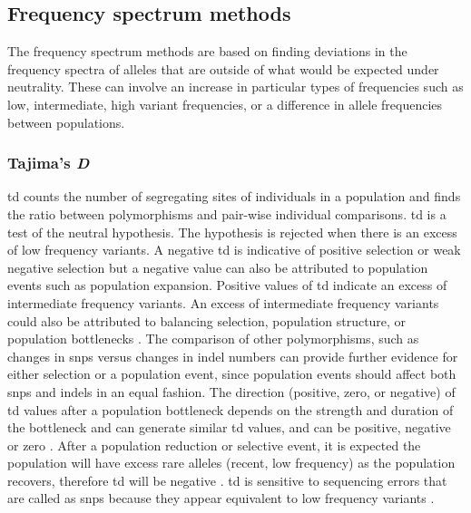 \documentclass[]{report}
\begin{document}
\subsection{Frequency spectrum
methods}\label{frequency-spectrum-methods}

The frequency spectrum methods are based on finding deviations in the
frequency spectra of alleles that are outside of what would be expected
under neutrality. These can involve an increase in particular types of
frequencies such as low, intermediate, high variant frequencies, or a
difference in allele frequencies between populations.

\subsubsection{\texorpdfstring{Tajima's
\emph{D}}{Tajima's D}}\label{tajimas-d}

\gls{td} \citep{Tajima1989} counts the number of segregating sites of
individuals in a population and finds the ratio between polymorphisms
and pair-wise individual comparisons. \Gls{td} is a test of the neutral
hypothesis. The hypothesis is rejected when there is an excess of low
frequency variants. A negative \gls{td} is indicative of positive
selection or weak negative selection but a negative value can also be
attributed to population events such as population expansion. Positive
values of \gls{td} indicate an excess of intermediate frequency
variants. An excess of intermediate frequency variants could also be
attributed to balancing selection, population structure, or population
bottlenecks \citep{Kreitman2000, Nielsen2005, nielsen2007recent}. The
comparison of other polymorphisms, such as changes in \glspl{snp} versus
changes in \gls{indel} numbers can provide further evidence for either
selection or a population event, since population events should affect
both \glspl{snp} and \glspl{indel} in an equal fashion. The direction
(positive, zero, or negative) of \gls{td} values after a population
bottleneck depends on the strength and duration of the bottleneck and
can generate similar \gls{td} values, and can be positive, negative or
zero \citep{Fay1999}. After a population reduction or selective event,
it is expected the population will have excess rare alleles (recent, low
frequency) as the population recovers, therefore \gls{td} will be
negative \citep{Barton1998}. \Gls{td} is sensitive to sequencing errors
that are called as \glspl{snp} because they appear equivalent to low
frequency variants \citep{Achaz2008}.
\end{document}
